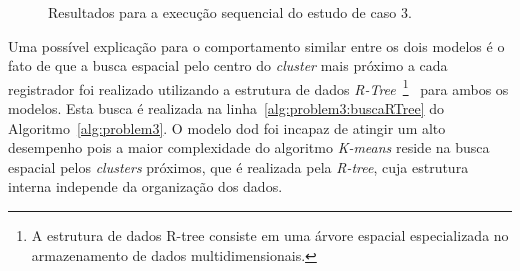 \begin{figure}[hbt]
    \centering
    \caption{Resultados para a execução sequencial do estudo de caso 3.}
    \label{fig:resultsProblem3sequential}
\end{figure}

Uma possível explicação para o comportamento similar entre os dois modelos é o fato de que a busca espacial pelo centro do \textit{cluster} mais próximo a cada registrador foi realizado utilizando a estrutura de dados \textit{R-Tree}~\footnote{A estrutura de dados R-tree consiste em uma árvore espacial especializada no armazenamento de dados multidimensionais.}~\cite{manolopoulos2010r} para ambos os modelos.
Esta busca é realizada na linha~\ref{alg:problem3:buscaRTree} do Algoritmo~\ref{alg:problem3}. 
O modelo \ac{dod} foi incapaz de atingir um alto desempenho pois a maior complexidade do algoritmo \textit{K-means} reside na busca espacial pelos \textit{clusters} próximos, que é realizada pela \textit{R-tree}, cuja estrutura interna independe da organização dos dados.

